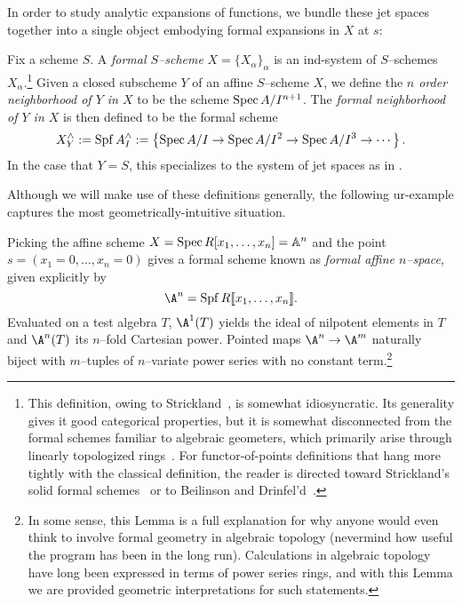 In order to study analytic expansions of functions, we bundle these jet spaces together into a single object embodying formal expansions in \(X\) at \(s\):
\begin{definition}\label{DefnCompletion}
Fix a scheme \(S\).  A \textit{formal \(S\)--scheme} \(X = \{X_\alpha\}_\alpha\) is an ind-system of \(S\)--schemes \(X_\alpha\).\footnote{This definition, owing to Strickland~\cite[Definition 4.1]{StricklandFSFG}, is somewhat idiosyncratic.  Its generality gives it good categorical properties, but it is somewhat disconnected from the formal schemes familiar to algebraic geometers, which primarily arise through linearly topologized rings~\cite[pg.\ 194]{Hartshorne}.  For functor-of-points definitions that hang more tightly with the classical definition, the reader is directed toward Strickland's solid formal schemes~\cite[Definition 4.16]{StricklandFSFG} or to Beilinson and Drinfel'd~\cite[Section 7.11.1]{BeilinsonDrinfeld}.}  Given a closed subscheme \(Y\) of an affine \(S\)--scheme \(X\), we define the \textit{\(n\){\th} order neighborhood of \(Y\) in \(X\)} to be the scheme \(\operatorname{Spec} A/I^{n+1}\).  The \textit{formal neighborhood of \(Y\) in \(X\)} is then defined to be the formal scheme \[X^\wedge_Y := \operatorname{Spf} A^\wedge_I := \left\{ \operatorname{Spec} A/I \to \operatorname{Spec} A/I^2 \to \operatorname{Spec} A/I^3 \to \cdots \right\}.\]  In the case that \(Y = S\), this specializes to the system of jet spaces as in .
\end{definition}

Although we will make use of these definitions generally, the following ur-example captures the most geometrically-intuitive situation.

\begin{example}\label{MapsOfFVarsArePowerSeries}
Picking the affine scheme \(X = \operatorname{Spec} R[x_1, \ldots, x_n] = \mathbb A^n\) and the point \(s = (x_1 = 0, \ldots, x_n = 0)\) gives a formal scheme known as \textit{formal affine \(n\)--space}, given explicitly by \[\A^n = \Spf R\llbracket x_1, \ldots, x_n\rrbracket.\]  Evaluated on a test algebra \(T\), \(\A^1(T)\) yields the ideal of nilpotent elements in \(T\) and \(\A^n(T)\) its \(n\)--fold Cartesian power.  Pointed maps \(\A^n \to \A^m\) naturally biject with \(m\)--tuples of \(n\)--variate power series with no constant term.\footnote{In some sense, this Lemma is a full explanation for why anyone would even think to involve formal geometry in algebraic topology (nevermind how useful the program has been in the long run).  Calculations in algebraic topology have long been expressed in terms of power series rings, and with this Lemma we are provided geometric interpretations for such statements.}
\end{example}

